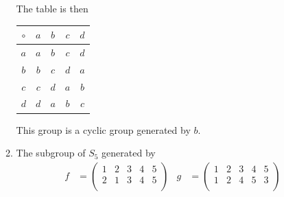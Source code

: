\documentclass[twoside]{amsart}
\begin{document}
\begin{enumerate}[A.]
\begin{enumerate}[1]
      The table is then
      \begin{center}
      \begin{tabular}{c|cccc}
         $\circ$ & $a$ & $b$ & $c$ & $d$ \\ \hline
	     $a$ & $a$ & $b$ & $c$ & $d$ \\
	     $b$ & $b$ & $c$ & $d$ & $a$ \\
	     $c$ & $c$ & $d$ & $a$ & $b$ \\
	     $d$ & $d$ & $a$ & $b$ & $c$
      \end{tabular}
      \end{center}

      This group is a cyclic group generated by $b$.

      \item The subgroup of $S_5$ generated by 
      \begin{align*}
         f & = \begin{pmatrix}
	          1 & 2 & 3 & 4 & 5 \\
		  2 & 1 & 3 & 4 & 5 \\
	       \end{pmatrix}
	       &
	 g & = \begin{pmatrix}
	          1 & 2 & 3 & 4 & 5 \\
		  1 & 2 & 4 & 5 & 3 \\
	       \end{pmatrix}
      \end{align*}


\end{enumerate}
\end{enumerate}
\end{document}
